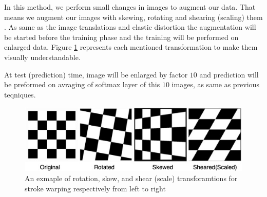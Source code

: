 In this method, we perform small changes in images to augment our data.  That means we augment our
images with skewing, rotating and shearing (scaling) them \cite{storke_warping_1997_source}. As same as the
image translations and elastic distortion the augmentation will be started before the
training phase and the training will be performed on enlarged data. Figure
\ref{fig:stroke_warping_transforamtions} represents each mentioned transformation to make them visually
understandable.

At test (prediction) time, image will be enlarged by factor $10$ and prediction will be preformed on
avraging of softmax layer of this $10$ images, as same as previous teqniques.

\begin{figure}
  \centering
  \label{fig:stroke_warping_transforamtions}
  \includegraphics[width=1\textwidth]{fig/stroke_warping_transforamtions}
  \caption{An exmaple of rotation, skew, and shear (scale) transforamtions for stroke warping respectively from left to right \cite{stroke_warping_github_picture}}
\end{figure}


